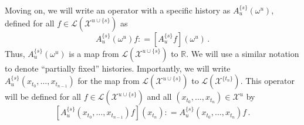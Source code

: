 \documentclass[10pt]{paper}
\newcommand{\states}{\mathcal{X}}
\newcommand{\gambles}{\mathcal{L}}
\newcommand{\coloneqq}{:\!=}
\begin{document}
Moving on, we will write an operator with a specific history as $A_u^{\{s\}}(\omega^u)$, defined for all $f\in\gambles(\states^{u\cup\{s\}})$ as
\begin{equation*}
A_u^{\{s\}}(\omega^u)f \coloneqq \left[A_u^{\{s\}}f\right](\omega^u)\,.
\end{equation*}
Thus, $A_u^{\{s\}}(\omega^u)$ is a map from $\gambles(\states^{u\cup\{s\}})$ to $\mathbb{R}$. %
We will use a similar notation to denote ``partially fixed'' histories. Importantly, we will write $A_u^{\{s\}}(x_{t_0},\ldots,x_{t_{n-1}})$ for the map from $\gambles(\states^{u\cup\{s\}})$ to $\gambles(\states^{\{t_n\}})$. This operator will be defined for all $f\in\gambles(\states^{u\cup\{s\}})$ and all $(x_{t_0},\ldots,x_{t_n})\in\states^u$ by
\begin{equation*}
\left[A_u^{\{s\}}(x_{t_0},\ldots,x_{t_{n-1}})f\right](x_{t_n}) \coloneqq A_u^{\{s\}}(x_{t_0},\ldots,x_{t_n})f\,.
\end{equation*}
\end{document}
